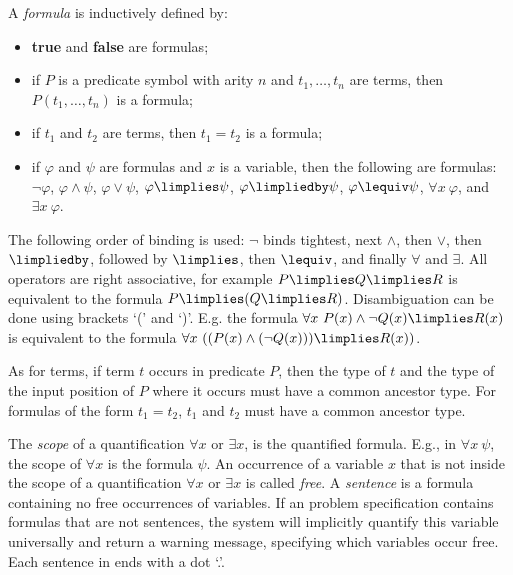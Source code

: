 A \emph{formula} is inductively defined by:
\begin{itemize}
	\item \textbf{true} and \textbf{false} are formulas;
	\item if $P$ is a predicate symbol with arity $n$ and $t_1,\ldots,t_n$ are terms, then $P(t_1,\ldots,t_n)$ is a formula;
	\item if $t_1$ and $t_2$ are terms, then $t_1 = t_2$ is a formula;
	\item if $\varphi$ and $\psi$ are formulas and $x$ is a variable, then the following are formulas: $\lnot \varphi$, $\varphi \land \psi$, $\varphi \lor \psi$, $\varphi \limplies \psi$, $\varphi \limpliedby \psi$, $\varphi \lequiv \psi$, $\forall x\ \varphi$, and $\exists x\ \varphi$.
\end{itemize}
The following order of binding is used: $\lnot$ binds tightest, next $\land$, then $\lor$, then $\limpliedby$, followed by $\limplies$, then $\lequiv$, and finally $\forall$ and $\exists$. 
All operators are right associative, for example $P \limplies Q \limplies R$ is equivalent to the formula $P \limplies (Q \limplies R)$.
Disambiguation can be done using brackets `(' and `)'. E.g. the formula $\forall x\ P(x) \land \lnot Q(x) \limplies R(x)$ is equivalent to the formula $\forall x\ ((P(x) \land (\lnot Q(x))) \limplies R(x))$. 

As for terms, if term $t$ occurs in predicate $P$, then the type of $t$ and the type of the input position of $P$ where it occurs must have a common ancestor type. For formulas of the form $t_1 = t_2$, $t_1$ and $t_2$ must have a common ancestor type.


The \emph{scope} of a quantification $\forall x$ or $\exists x$, is the quantified formula. E.g., in $\forall x\ \psi$, the scope of $\forall x$ is the formula $\psi$. An occurrence of a variable $x$ that is not inside the scope of a quantification $\forall x$ or $\exists x$ is called \emph{free}. A \emph{sentence} is a formula containing no free occurrences of variables. If an \idp problem specification contains formulas that are not sentences, the system will implicitly quantify this variable universally and return a warning message, specifying which variables occur free. Each sentence in \idp ends with a dot `.'.

